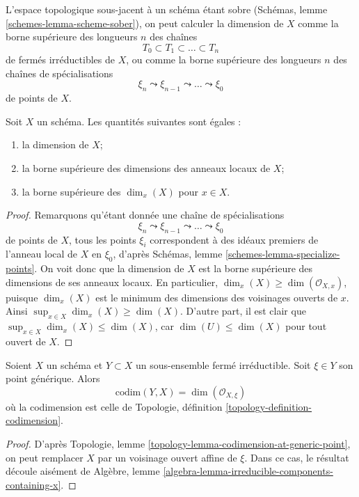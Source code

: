 \noindent
L'espace topologique sous-jacent à un schéma étant sobre
(Schémas, lemme \ref{schemes-lemma-scheme-sober}),
on peut calculer la dimension de $X$ comme la borne supérieure des longueurs $n$
des chaînes
$$
T_0 \subset T_1 \subset \ldots \subset T_n
$$
de fermés irréductibles de $X$, ou comme la borne supérieure des longueurs $n$
des chaînes de spécialisations
$$
\xi_n \leadsto \xi_{n - 1} \leadsto \ldots \leadsto \xi_0
$$
de points de $X$.

\begin{lemma}
\label{lemma-dimension}
Soit $X$ un schéma. Les quantités suivantes sont égales :
\begin{enumerate}
\item la dimension de $X$;
\item la borne supérieure des dimensions des anneaux locaux de $X$;
\item la borne supérieure des $\dim_x(X)$ pour $x \in X$.
\end{enumerate}
\end{lemma}

\begin{proof}
Remarquons qu'étant donnée une chaîne de spécialisations
$$
\xi_n \leadsto \xi_{n - 1} \leadsto \ldots \leadsto \xi_0
$$
de points de $X$, tous les points $\xi_i$ correspondent à des idéaux
premiers de l'anneau local de $X$ en $\xi_0$,
d'après Schémas, lemme \ref{schemes-lemma-specialize-points}.
On voit donc que la dimension de $X$ est la borne supérieure des dimensions
de ses anneaux locaux. En particulier, $\dim_x(X) \geq \dim(\mathcal{O}_{X, x})$,
puisque $\dim_x(X)$ est le minimum des dimensions des voisinages ouverts de
$x$. Ainsi $\sup_{x \in X} \dim_x(X) \geq \dim(X)$. D'autre part, il
est clair que $\sup_{x \in X} \dim_x(X) \leq \dim(X)$,
car $\dim(U) \leq \dim(X)$ pour tout ouvert de $X$.
\end{proof}

\begin{lemma}
\label{lemma-codimension-local-ring}
Soient $X$ un schéma et $Y \subset X$ un sous-ensemble fermé
irréductible. Soit $\xi \in Y$ son point générique. Alors
$$
\text{codim}(Y, X) = \dim(\mathcal{O}_{X, \xi})
$$
où la codimension est celle de
Topologie, définition \ref{topology-definition-codimension}.
\end{lemma}

\begin{proof}
D'après Topologie, lemme \ref{topology-lemma-codimension-at-generic-point},
on peut remplacer $X$ par un voisinage ouvert affine de $\xi$. Dans ce
cas, le résultat découle aisément de
Algèbre, lemme \ref{algebra-lemma-irreducible-components-containing-x}.
\end{proof}

